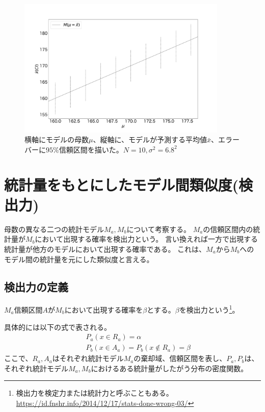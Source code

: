 \begin{figure}
    \begin{center}
        \includegraphics[width=10cm]{./image/04_/confidence_interval_model.pdf}
        \caption{横軸にモデルの母数$\mu$、縦軸に、モデルが予測する平均値$\bar{x}$、エラーバーに$95\%$信頼区間を描いた。$N=10,\sigma^2=6.8^2$}
        \label{fig:confidence_interval_model}

    \end{center}
\end{figure}



\section{統計量をもとにしたモデル間類似度(検出力)}
母数の異なる二つの統計モデル$M_a,M_b$について考察する。
$M_a$の信頼区間内の統計量が$M_b$において出現する確率を検出力という。
言い換えれば一方で出現する統計量が他方のモデルにおいて出現する確率である。
これは、$M_a$から$M_b$へのモデル間の統計量を元にした類似度と言える。

\subsection{検出力の定義}
$M_a$信頼区間$A$が$M_b$において出現する確率を$\beta$とする。$\beta$を検出力という\footnote{検出力を検定力または統計力と呼ぶこともある。\\ \url{https://id.fnshr.info/2014/12/17/stats-done-wrong-03/}}。

具体的には以下の式で表される。
\begin{eqnarray*}
    & &P_a(x \in R_a) = \alpha\\
    & & P_b(x \in A_a) = P_b(x\notin R_a )=\beta
\end{eqnarray*}
ここで、$R_a,A_a$はそれぞれ統計モデル$M_a$の棄却域、信頼区間を表し、$P_a,P_b$は、それぞれ統計モデル$M_a,M_b$におけるある統計量がしたがう分布の密度関数。

